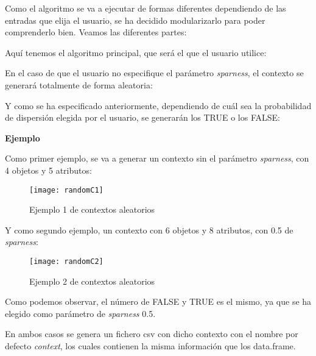     Como el algoritmo se va a ejecutar de formas diferentes dependiendo de las entradas que elija el usuario, se ha decidido modularizarlo 
    para poder comprenderlo bien. Veamos las diferentes partes:


    Aqu\'i tenemos el algoritmo principal, que ser\'a el que el usuario utilice:

    
    \bigskip

    En el caso de que el usuario no especifique el par\'ametro \textit{sparness}, el contexto se generar\'a totalmente de forma aleatoria:

    
    \bigskip

    Y como se ha especificado anteriormente, dependiendo de cu\'al sea la probabilidad de dispersi\'on elegida por el usuario, se generar\'an 
    los TRUE o los FALSE:

    
    \clearpage
    
    \bigskip

    \textbf{Ejemplo}

    Como primer ejemplo, se va a generar un contexto sin el par\'ametro \textit{sparness}, con 4 objetos y 5 atributos:

    \begin{figure}[H]
        \centering
        \texttt{[image: randomC1]}
        \caption{Ejemplo 1 de contextos aleatorios}
        \label{fig:randomC1}
    \end{figure}

    \bigskip
    Y como segundo ejemplo, un contexto con 6 objetos y 8 atributos, con 0.5 de \textit{sparness}:

    \begin{figure}[H]
        \centering
        \texttt{[image: randomC2]}
        \caption{Ejemplo 2 de contextos aleatorios}
        \label{fig:randomC2}
    \end{figure}

    Como podemos observar, el n\'umero de FALSE y TRUE es el mismo, ya que se ha elegido como par\'ametro de \textit{sparness} 0.5.
    

    En ambos casos se genera un fichero csv con dicho contexto con el nombre por defecto \textit{context}, los cuales contienen la misma 
    informaci\'on que los data.frame.

    \newpage
    \thispagestyle{empty}
    \mbox{}
    \newpage